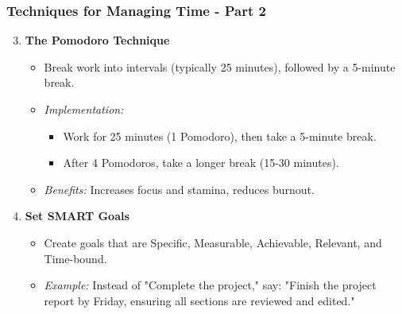 \documentclass[aspectratio=169]{beamer}
\begin{document}
\begin{frame}[fragile]
    \frametitle{Techniques for Managing Time - Part 2}
    \begin{enumerate}
        \setcounter{enumi}{2} %
        \item \textbf{The Pomodoro Technique}
            \begin{itemize}
                \item Break work into intervals (typically 25 minutes), followed by a 5-minute break.
                \item \textit{Implementation:}
                    \begin{itemize}
                        \item Work for 25 minutes (1 Pomodoro), then take a 5-minute break.
                        \item After 4 Pomodoros, take a longer break (15-30 minutes).
                    \end{itemize}
                \item \textit{Benefits:} Increases focus and stamina, reduces burnout.
            \end{itemize}
        
        \item \textbf{Set SMART Goals}
            \begin{itemize}
                \item Create goals that are Specific, Measurable, Achievable, Relevant, and Time-bound.
                \item \textit{Example:} Instead of "Complete the project," say: "Finish the project report by Friday, ensuring all sections are reviewed and edited."
            \end{itemize}
    \end{enumerate}
\end{frame}
\end{document}
